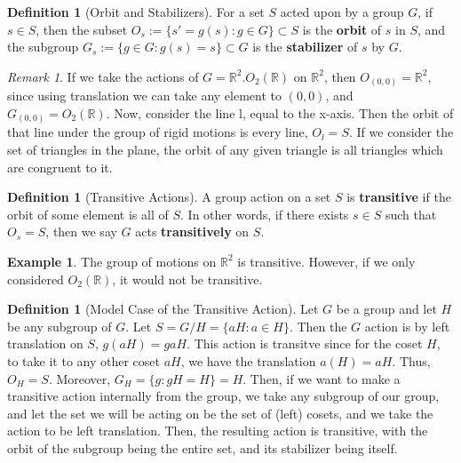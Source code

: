 \documentclass[12pt]{article}
\theoremstyle{definition}
\newtheorem{defn}[thm]{Definition}
\newtheorem{eg}[thm]{Example}
\theoremstyle{remark}
\newtheorem{rmk}[thm]{Remark}
\numberwithin{equation}{section}
\newcommand\R{\mathbb R}    %
\newcommand\B[1]{\textbf{ #1}}
\begin{document}
\vspace{15pt}

\begin{defn}[Orbit and Stabilizers]
        For a set $S$ acted upon by a group $G$, if $s \in S$, then the subset $O_s := \{s' = g(s): g\in G\} \subset S$ is the \B{orbit} of $s$ in $S$, and the subgroup $G_s := \{g \in G:g(s) =s\} \subset G$ is the \B{stabilizer} of $s$ by $G$. 
\end{defn}

\vspace{15pt}

\begin{rmk}
        If we take the actions of $G = \R^2.O_2(\R)$ on $\R^2$, then $O_{(0,0)} = \R^2$, since using translation we can take any element to $(0,0)$, and $G_{(0,0)} = O_2(\R)$. Now, consider the line l, equal to the x-axis. Then the orbit of that line under the group of rigid motions is every line, $O_l = S$. If we consider the set of triangles in the plane, the orbit of any given triangle is all triangles which are congruent to it.
\end{rmk}


\vspace{15pt}

\begin{defn}[Transitive Actions]
        A group action on a set $S$ is \B{transitive} if the orbit of some element is all of $S$. In other words, if there exists $s \in S$ such that $O_s = S$, then we say $G$ acts \B{transitively} on $S$. 
\end{defn}


\vspace{15pt}

\begin{eg}
        The group of motions on $\R^2$ is transitive. However, if we only considered $O_2(\R)$, it would not be transitive.
\end{eg}


\vspace{15pt}

\begin{defn}[Model Case of the Transitive Action]
        Let $G$ be a group and let $H$ be any subgroup of $G$. Let $S = G/H = \{aH: a \in H\}$. Then the $G$ action is by left translation on $S$, $g(aH) = gaH$. This action is transitve since for the coset $H$, to take it to any other coset $aH$, we have the translation $a(H) = aH$. Thus, $O_H = S$. Moreover, $G_H = \{g: gH = H\} = H$. Then, if we want to make a transitive action internally from the group, we take any subgroup of our group, and let the set we will be acting on be the set of (left) cosets, and we take the action to be left translation. Then, the resulting action is transitive, with the orbit of the subgroup being the entire set, and its stabilizer being itself.
\end{defn}
\end{document}
